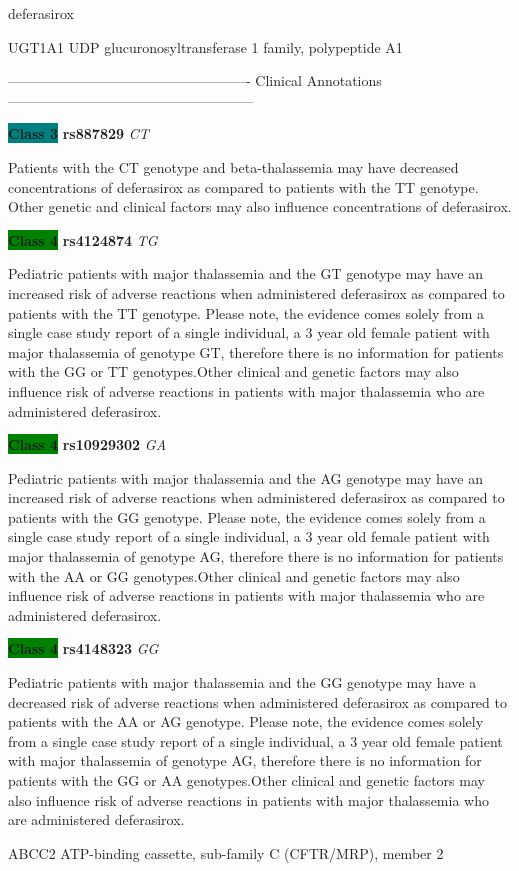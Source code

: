 \documentclass{resume} %
\begin{document}
\begin{rSection}{ deferasirox }
\begin{rSubsection}{ UGT1A1 }{ UDP glucuronosyltransferase 1 family, polypeptide A1 }{}{}
\item[] ---------------------------------------------------- Clinical Annotations -----------------------------------------------------\newline
\item \textbf{\colorbox{teal} {Class 3}} \textbf{ rs887829 } \textit{ CT }
\item[] Patients with the CT genotype and beta-thalassemia may have decreased concentrations of deferasirox as compared to patients with the TT genotype. Other genetic and clinical factors may also influence concentrations of deferasirox.\item \textbf{\colorbox{green} {Class 4}} \textbf{ rs4124874 } \textit{ TG }
\item[] Pediatric patients with major thalassemia and the GT genotype may have an increased risk of adverse reactions when administered deferasirox as compared to patients with the TT genotype. Please note, the evidence comes solely from a single case study report of a single individual, a 3 year old female patient with major thalassemia of genotype GT, therefore there is no information for patients with the GG or TT genotypes.Other clinical and genetic factors may also influence risk of adverse reactions in patients with major thalassemia who are administered deferasirox. \item \textbf{\colorbox{green} {Class 4}} \textbf{ rs10929302 } \textit{ GA }
\item[] Pediatric patients with major thalassemia and the AG genotype may have an increased risk of adverse reactions when administered deferasirox as compared to patients with the GG genotype. Please note, the evidence comes solely from a single case study report of a single individual, a 3 year old female patient with major thalassemia of genotype AG, therefore there is no information for patients with the AA or GG genotypes.Other clinical and genetic factors may also influence risk of adverse reactions in patients with major thalassemia who are administered deferasirox.\item \textbf{\colorbox{green} {Class 4}} \textbf{ rs4148323 } \textit{ GG }
\item[] Pediatric patients with major thalassemia and the GG genotype may have a decreased risk of adverse reactions when administered deferasirox as compared to patients with the AA or AG genotype. Please note, the evidence comes solely from a single case study report of a single individual, a 3 year old female patient with major thalassemia of genotype AG, therefore there is no information for patients with the GG or AA genotypes.Other clinical and genetic factors may also influence risk of adverse reactions in patients with major thalassemia who are administered deferasirox.
\end{rSubsection}\begin{rSubsection}{ ABCC2 }{ ATP-binding cassette, sub-family C (CFTR/MRP), member 2 }{}{}
\item[]


\end{rSubsection}
\end{rSection}
\end{document}
